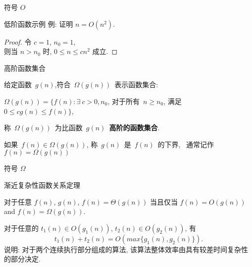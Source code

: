 \documentclass[fontset=fandol,UTF8,12pt,aspectratio=169,fleqn]{beamer}
\begin{document}
\begin{frame}{符号 $O$}
\begin{figure}
  \centering
\end{figure}
\end{frame}

\begin{frame}{低阶函数示例}
例: 证明 $n=O(n^2)$.  \\ \pause
\begin{proof}
 令 $c=1$, $n_0=1$,   \\ \pause
则当 $n>n_0$ 时, $0\leq n \leq cn^2$ 成立.   \pause
\end{proof}
\end{frame}

\begin{frame}{高阶函数集合}
\begin{definition}[高阶函数集合]
给定函数~$g(n)$,符合~$\Omega(g(n))$~表示函数集合: 

    $\Omega(g(n)) =  \{f(n): \exists\ c>0,  n_0$, 对于所有~$n\geq n_0$, 满足~ $0\leq cg(n) \leq f(n) \}$,

称~$\Omega(g(n))$~为比函数~$g(n)$~\textbf{高阶的函数集合}.  

 如果~$f(n) \in \Omega(g(n))$, 称~$g(n)$~是~$f(n)$~的下界, 
~通常记作~$f(n)=\Omega(g(n))$  
\end{definition}
\end{frame}

\begin{frame}{符号 $\Omega$}

\begin{figure}
  \centering
\end{figure}
\end{frame}

\begin{frame}{渐近复杂性函数关系定理}
\begin{Theorem}
  对于任意 $f(n)$, $g(n)$, $f(n)=\Theta(g(n))$ 当且仅当 $f(n)=O(g(n))$ and $f(n)=\Omega(g(n))$. 
\end{Theorem}


\begin{Theorem}
  对于任意的 $t_1(n) \in O(g_1(n))$, $t_2(n)\in O(g_2(n))$, 有 
  \begin{displaymath}
    t_1(n)+t_2(n)=O(max\{g_1(n), g_2(n)\}). 
  \end{displaymath}
说明: 对于两个连续执行部分组成的算法, 该算法整体效率由具有较差时间复杂性的部分决定.  
\end{Theorem}
\end{frame}
\end{document}
